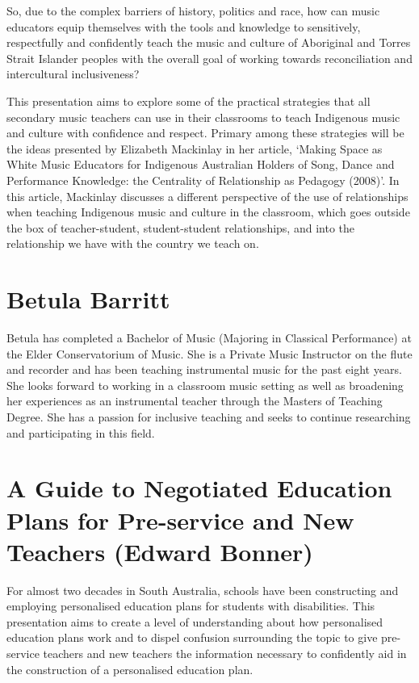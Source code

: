 \documentclass[twoside,14pt,a4paper,notitlepage]{memoir}
\begin{document}
So, due to the complex barriers of history, politics and race, how can music educators equip themselves with the tools and knowledge to sensitively, respectfully and confidently teach the music and culture of Aboriginal and Torres Strait Islander peoples with the overall goal of working towards reconciliation and intercultural inclusiveness?

This presentation aims to explore some of the practical strategies that all secondary music teachers can use in their classrooms to teach Indigenous music and culture with confidence and respect. Primary among these strategies will be the ideas presented by Elizabeth Mackinlay in her article, ‘Making Space as White Music Educators for Indigenous Australian Holders of Song, Dance and Performance Knowledge: the Centrality of Relationship as Pedagogy (2008)’. In this article, Mackinlay discusses a different perspective of the use of relationships when teaching Indigenous music and culture in the classroom, which goes outside the box of teacher-student, student-student relationships, and into the relationship we have with the country we teach on.


\section*{Betula Barritt}

Betula has completed a Bachelor of Music (Majoring in Classical Performance) at the Elder Conservatorium of Music. She is a Private Music Instructor on the flute and recorder and has been teaching instrumental music for the past eight years. She looks forward to working in a classroom music setting as well as broadening her experiences as an instrumental teacher through the Masters of Teaching Degree. She has a passion for inclusive teaching and seeks to continue researching and participating in this field.



\section*{A Guide to Negotiated Education Plans for Pre-service and New Teachers (Edward Bonner)}
\label{aut:bonner}

For almost two decades in South Australia, schools have been constructing and employing personalised education plans for students with disabilities. This presentation aims to create a level of understanding about how personalised education plans work and to dispel confusion surrounding the topic to give pre-service teachers and new teachers the information necessary to confidently aid in the construction of a personalised education plan. 
\end{document}

